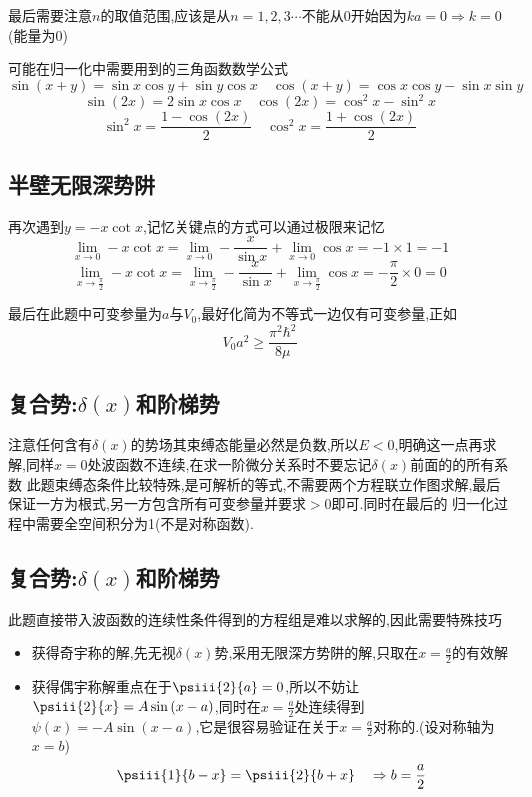         最后需要注意$n$的取值范围,应该是从$n=1,2,3\cdots$不能从0开始因为$ka=0 \Rightarrow k=0$(能量为0)
        
        可能在归一化中需要用到的三角函数数学公式
        $$\sin(x+y)=\sin{x} \cos{y}+\sin{y}\cos{x} \quad \cos(x+y)=\cos{x} \cos{y} - \sin{x}\sin{y}$$ 
        $$\sin(2x) = 2\sin{x} \cos{x} \quad \cos(2x) = \cos^{2}{x} - \sin^{2}{x} $$
        $$\sin^{2}{x}=\frac{1-\cos(2x)}{2} \quad \cos^{2}{x}=\frac{1+\cos(2x)}{2} $$

    \subsection{半壁无限深势阱}
        再次遇到$y=-x \cot{x}$,记忆关键点的方式可以通过极限来记忆
        $$\lim_{x \to 0}- x \cot{x} = \lim_{x \to 0} -\frac{x}{\sin{x}} + \lim_{x \to 0}\cos{x} = -1 \times 1 = -1  $$
        $$\lim_{x \to \frac{\pi}{2}}- x \cot{x} = \lim_{x \to \frac{\pi}{2}} -\frac{x}{\sin{x}} + \lim_{x \to \frac{\pi}{2}}\cos{x} = -\frac{\pi}{2} \times 0 = 0  $$
        
        最后在此题中可变参量为$a$与$V_{0}$,最好化简为不等式一边仅有可变参量,正如
        $$V_{0}a^{2}\geq \frac{\pi^{2}\hbar^{2}}{8 \mu} $$

    \subsection{复合势:\texorpdfstring{$\delta(x)$}{}和阶梯势}
        注意任何含有$\delta(x)$的势场其束缚态能量必然是负数,所以$E<0$,明确这一点再求解,同样$x=0$处波函数不连续,在求一阶微分关系时不要忘记$\delta(x)$前面的的所有系数
        此题束缚态条件比较特殊,是可解析的等式,不需要两个方程联立作图求解,最后保证一方为根式,另一方包含所有可变参量并要求$>0$即可.同时在最后的
        归一化过程中需要全空间积分为1(不是对称函数).

    \subsection{复合势:\texorpdfstring{$\delta(x)$}{}和阶梯势}
        此题直接带入波函数的连续性条件得到的方程组是难以求解的,因此需要特殊技巧
        \begin{itemize}
            \item 获得奇宇称的解,先无视$\delta(x)$势,采用无限深方势阱的解,只取在$x=\frac{a}{2}$的有效解
            \item 获得偶宇称解重点在于$\psiii{2}{a}=0$,所以不妨让$\psiii{2}{x}=A \sin{(x-a)}$,同时在$x=\frac{a}{2}$处连续得到$\psi(x)=-A \sin{(x-a)}$,它是很容易验证在关于$x=\frac{a}{2}$对称的.(设对称轴为$x=b$)
                $$\psiii{1}{b-x}=\psiii{2}{b+x} \quad \Rightarrow b=\frac{a}{2}$$
        \end{itemize}

